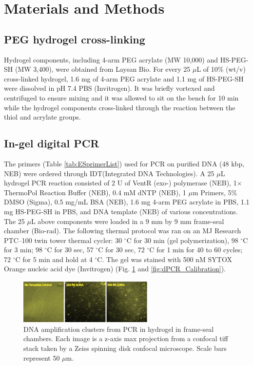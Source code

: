 \section{Materials and Methods}
\subsection{PEG hydrogel cross-linking}
Hydrogel components, including 4-arm PEG acrylate (MW 10,000) and HS-PEG-SH (MW 3,400), were obtained from Laysan Bio. For every 25 $\mu$L of 10\% (wt\slash v) cross-linked hydrogel, 1.6 mg of 4-arm PEG acrylate and 1.1 mg of HS-PEG-SH were dissolved in pH 7.4 PBS (Invitrogen). It was briefly vortexed and centrifuged to ensure mixing and it was allowed to sit on the bench for 10 min while the hydrogel components cross-linked through the reaction between the thiol and acrylate groups.
\subsection{In-gel digital PCR}
The primers (Table \ref{tab:ESprimerList}) used for PCR on purified \textlambda DNA (48 kbp, NEB) were ordered through IDT(Integrated DNA Technologies). A 25 $\mu$L hydrogel PCR reaction consisted of 2 U of VentR (exo-) polymerase (NEB), 1$\times$ ThermoPol Reaction Buffer (NEB), 0.4 mM dNTP (NEB), 1 $\mu$m Primers, 5\% DMSO (Sigma), 0.5 mg\slash mL BSA (NEB), 1.6 mg 4-arm PEG acrylate in PBS, 1.1 mg HS-PEG-SH in PBS, and \textlambda DNA template (NEB) of various concentrations. The 25 $\mu$L above components were loaded in a 9 mm by 9 mm frame-seal chamber (Bio-rad). The following thermal protocol was ran on an MJ Research PTC--100 twin tower thermal cycler: 30 $^{\circ}$C for 30 min (gel polymerization), 98 $^{\circ}$C for 3 min; 98 $^{\circ}$C for 30 sec, 57 $^{\circ}$C for 30 sec, 72 $^{\circ}$C for 1 min for 40 to 60 cycles; 72 $^{\circ}$C for 5 min and hold at 4 $^{\circ}$C. The gel was stained with 500 nM SYTOX Orange nucleic acid dye (Invitrogen) (Fig. \ref{fig:dPCR_FS} and \ref{fig:dPCR_Calibration}).

\begin{figure}
\centering
\includegraphics[keepaspectratio,width=0.6\textwidth]{./figures/dPCR_FrameSeal.png}
\caption[DNA amplification clusters from PCR in frame-seal chambers.]{DNA amplification clusters from PCR in hydrogel in frame-seal chambers. Each image is a z-axis max projection from a confocal tiff stack taken by a Zeiss spinning disk confocal microscope. Scale bars represent 50 $\mu$m.}
\label{fig:dPCR_FS}
\end{figure}


